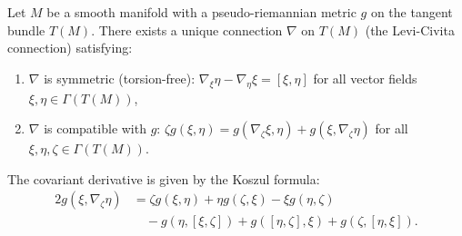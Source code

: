 Let $M$ be a smooth manifold with a pseudo-riemannian metric $g$ on the tangent bundle $T(M)$. There exists a unique connection $\nabla$ on $T(M)$ (the Levi-Civita connection) satisfying:
\begin{enumerate}
\item $\nabla$ is symmetric (torsion-free): $\nabla_\xi \eta - \nabla_\eta \xi = [\xi, \eta]$ for all vector fields $\xi, \eta \in \Gamma(T(M))$,
\item $\nabla$ is compatible with $g$: $\zeta g(\xi, \eta) = g(\nabla_\zeta \xi, \eta) + g(\xi, \nabla_\zeta \eta)$ for all $\xi, \eta, \zeta \in \Gamma(T(M))$.
\end{enumerate}
The covariant derivative is given by the Koszul formula:
\begin{align*}
2g(\xi, \nabla_\zeta \eta) &= \zeta g(\xi, \eta) + \eta g(\zeta, \xi) - \xi g(\eta, \zeta) \\
&\quad - g(\eta, [\xi, \zeta]) + g([\eta, \zeta], \xi) + g(\zeta, [\eta, \xi]).
\end{align*}
